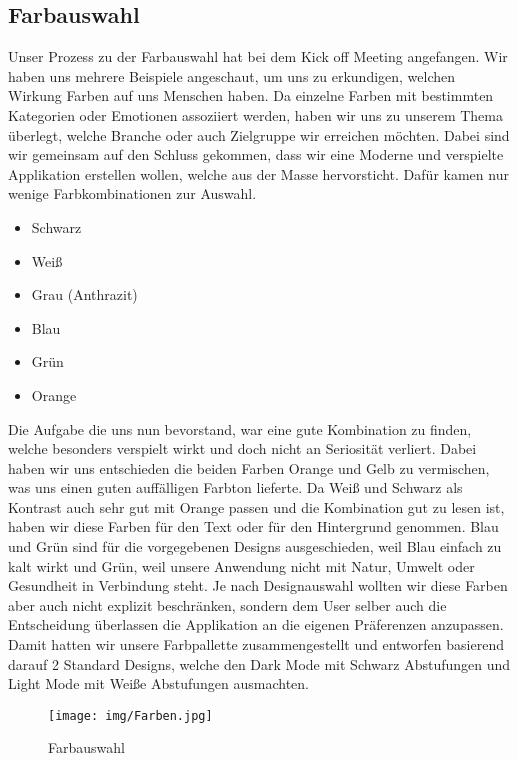 \documentclass{article}
\begin{document}
\subsection{Farbauswahl}
Unser Prozess zu der Farbauswahl hat bei dem Kick off Meeting angefangen. Wir haben uns mehrere Beispiele angeschaut, um uns zu erkundigen, welchen Wirkung Farben auf uns Menschen haben. Da einzelne Farben mit bestimmten Kategorien oder Emotionen assoziiert werden, haben wir uns zu unserem Thema überlegt, welche Branche oder auch Zielgruppe wir erreichen möchten. Dabei sind wir gemeinsam auf den Schluss gekommen, dass wir eine Moderne und verspielte Applikation erstellen wollen, welche aus der Masse hervorsticht. Dafür kamen nur wenige Farbkombinationen zur Auswahl. 
\begin{itemize}
    \item Schwarz
    \item Weiß
    \item Grau (Anthrazit)
    \item Blau
    \item Grün
    \item Orange
\end{itemize}

 \noindent Die Aufgabe die uns nun bevorstand, war eine gute Kombination zu finden, welche besonders verspielt wirkt und doch nicht an Seriosität verliert. Dabei haben wir uns entschieden die beiden Farben Orange und Gelb zu vermischen, was uns einen guten auffälligen Farbton lieferte. Da Weiß und Schwarz als Kontrast auch sehr gut mit Orange passen und die Kombination gut zu lesen ist, haben wir diese Farben für den Text oder für den Hintergrund genommen. Blau und Grün sind für die vorgegebenen Designs ausgeschieden, weil Blau einfach zu kalt wirkt und Grün, weil unsere Anwendung nicht mit Natur, Umwelt oder Gesundheit in Verbindung steht. 
 Je nach Designauswahl wollten wir diese Farben aber auch nicht explizit beschränken, sondern dem User selber auch die Entscheidung überlassen die Applikation an die eigenen Präferenzen anzupassen.
 Damit hatten wir unsere Farbpallette zusammengestellt und entworfen basierend darauf 2 Standard Designs, welche den Dark Mode mit Schwarz Abstufungen und Light Mode mit Weiße Abstufungen ausmachten.
 \begin{figure}[t]
 \centering
 \texttt{[image: img/Farben.jpg]}
 \caption{Farbauswahl}
 \label{fig:farbauswahl}
\end{figure}

\newpage
\end{document}

